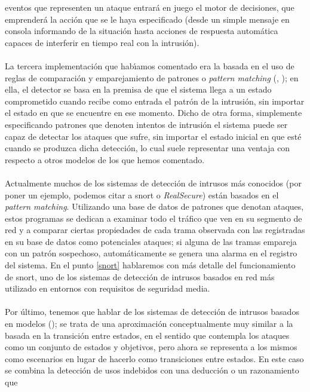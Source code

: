 eventos que representen un ataque entrar\'a en juego el motor de decisiones, que
emprender\'a la acci\'on que se le haya especificado (desde un simple mensaje
en consola informando de la situaci\'on hasta acciones de respuesta autom\'atica
capaces de interferir en tiempo real con la intrusi\'on).\\
\\La tercera implementaci\'on que hab\'{\i}amos comentado era la basada en el
uso de reglas de comparaci\'on y emparejamiento de patrones o {\it pattern 
matching} (\cite{kn:sg91}, \cite{kn:ks94}); en ella, el 
detector se basa en la premisa de que el sistema llega a un estado comprometido 
cuando recibe como entrada el patr\'on de la intrusi\'on, sin importar el 
estado en que se encuentre en ese momento. Dicho de otra forma, simplemente
especificando patrones que denoten intentos de intrusi\'on el sistema puede
ser capaz de detectar los ataques que sufre, sin importar el estado inicial en
que est\'e cuando se produzca dicha detecci\'on, lo cual suele representar una
ventaja con respecto a otros modelos de los que hemos comentado.\\
\\Actualmente muchos de los sistemas de detecci\'on de intrusos m\'as conocidos
(por poner un ejemplo, podemos citar a {\sc snort} o {\it RealSecure}) est\'an
basados en el {\it pattern matching}. Utilizando una base de datos de patrones
que denotan ataques, estos programas se dedican a examinar todo el tr\'afico 
que ven en su segmento de red y a comparar ciertas propiedades de cada trama
observada con las registradas en su base de datos como potenciales ataques; si
alguna de las tramas empareja con un patr\'on sospechoso, autom\'aticamente se
genera una alarma en el registro del sistema. En el punto \ref{snort} 
hablaremos con m\'as detalle del funcionamiento de {\sc snort}, uno de los
sistemas de detecci\'on de intrusos basados en red m\'as utilizado en entornos
con requisitos de seguridad media.\\
\\Por \'ultimo, tenemos que hablar de los sistemas de detecci\'on de intrusos
basados en modelos (\cite{kn:gl91}); se trata de una aproximaci\'on 
conceptualmente muy similar a la basada en la transici\'on entre estados, en el 
sentido que contempla los ataques como un conjunto de estados y objetivos, pero 
ahora se representa a los mismos como escenarios en lugar de hacerlo como 
transiciones entre estados. En este caso se combina la 
detecci\'on de usos indebidos con una deducci\'on o un ra\-zo\-na\-mien\-to que 
